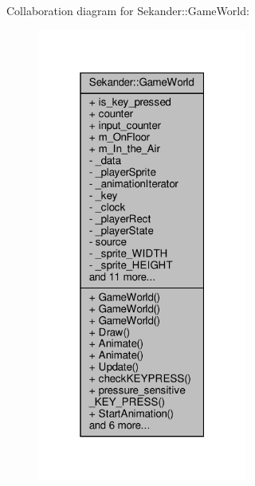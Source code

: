 Collaboration diagram for Sekander\+:\+:Game\+World\+:
\nopagebreak
\begin{figure}[H]
\begin{center}
\leavevmode
\includegraphics[width=196pt]{classSekander_1_1GameWorld__coll__graph}
\end{center}
\end{figure}
